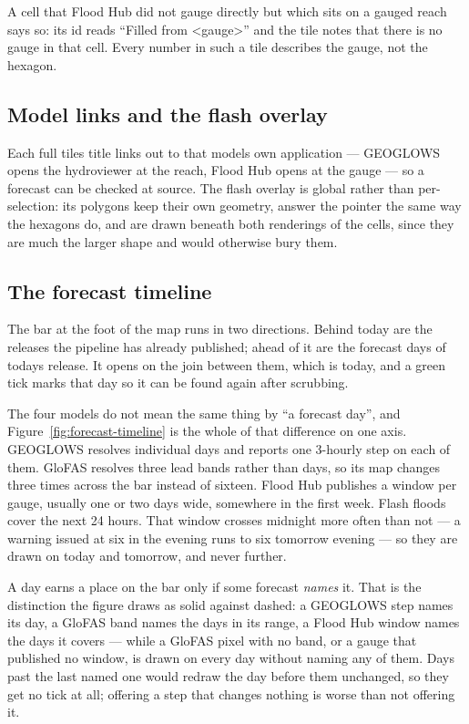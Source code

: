 A cell that Flood Hub did not gauge directly but which sits on a gauged reach says so: its id reads ``Filled from \textless gauge\textgreater'' and the tile notes that there is no gauge in that cell.
Every number in such a tile describes the gauge, not the hexagon.

\subsection{Model links and the flash overlay}\label{model-links-and-the-flash-overlay}

Each full tile\textquotesingle s title links out to that model\textquotesingle s own application --- GEOGLOWS opens the hydroviewer at the reach, Flood Hub opens at the gauge --- so a forecast can be checked at source.
The flash overlay is global rather than per-selection: its polygons keep their own geometry, answer the pointer the same way the hexagons do, and are drawn beneath both renderings of the cells, since they are much the larger shape and would otherwise bury them.

\subsection{The forecast timeline}\label{forecast-timeline}

The bar at the foot of the map runs in two directions.
Behind today are the releases the pipeline has already published; ahead of it are the forecast days of today\textquotesingle s release.
It opens on the join between them, which is today, and a green tick marks that day so it can be found again after scrubbing.

The four models do not mean the same thing by ``a forecast day'', and Figure~\ref{fig:forecast-timeline} is the whole of that difference on one axis.
GEOGLOWS resolves individual days and reports one 3-hourly step on each of them.
GloFAS resolves three lead bands rather than days, so its map changes three times across the bar instead of sixteen.
Flood Hub publishes a window per gauge, usually one or two days wide, somewhere in the first week.
Flash floods cover the next 24 hours.
That window crosses midnight more often than not --- a warning issued at six in the evening runs to six tomorrow evening --- so they are drawn on today and tomorrow, and never further.



A day earns a place on the bar only if some forecast \emph{names} it.
That is the distinction the figure draws as solid against dashed: a GEOGLOWS step names its day, a GloFAS band names the days in its range, a Flood Hub window names the days it covers --- while a GloFAS pixel with no band, or a gauge that published no window, is drawn on every day without naming any of them.
Days past the last named one would redraw the day before them unchanged, so they get no tick at all; offering a step that changes nothing is worse than not offering it.

